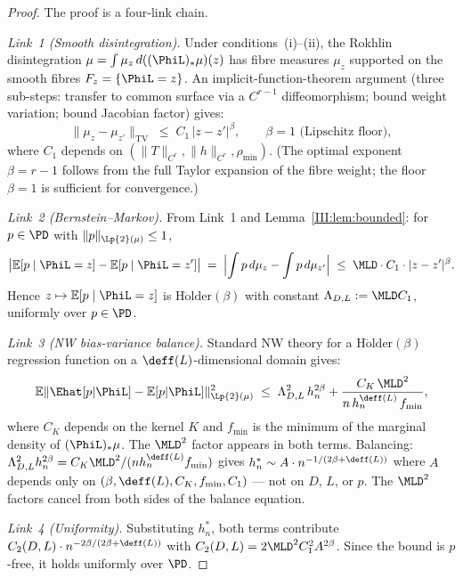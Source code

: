 \ifdraft
\begin{proof}
The proof is a four-link chain.

\emph{Link~1 (Smooth disintegration).}
Under conditions~(i)--(ii), the Rokhlin disintegration
$\mu = \int \mu_z\,d((\PhiL)_*\mu)(z)$ has fibre measures $\mu_z$ supported on
the smooth fibres $F_z = \{\PhiL = z\}$.
An implicit-function-theorem argument (three sub-steps: transfer to common
surface via a $C^{r-1}$ diffeomorphism; bound weight variation; bound
Jacobian factor) gives:
\[
  \|\mu_z - \mu_{z'}\|_{\mathrm{TV}} \;\leq\; C_1\,|z - z'|^\beta,
  \qquad \beta = 1 \text{ (Lipschitz floor)},
\]
where $C_1$ depends on $(\|T\|_{C^r}, \|h\|_{C^r}, \rho_{\min})$.
(The optimal exponent $\beta = r-1$ follows from the full Taylor expansion of
the fibre weight; the floor $\beta = 1$ is sufficient for convergence.)

\emph{Link~2 (Bernstein--Markov).}
From Link~1 and Lemma~\ref{III:lem:bounded}: for $p \in \PD$ with
$\|p\|_{\Lp{2}(\mu)} \leq 1$,
\[
  \bigl|\mathbb{E}[p \mid \PhiL = z] - \mathbb{E}[p \mid \PhiL = z']\bigr|
  \;=\; \Bigl|\int p\,d\mu_z - \int p\,d\mu_{z'}\Bigr|
  \;\leq\; \MLD \cdot C_1 \cdot |z - z'|^\beta.
\]
Hence $z \mapsto \mathbb{E}[p \mid \PhiL = z]$ is $\mathrm{H\ddot{o}lder}(\beta)$
with constant $\Lambda_{D,L} := \MLD C_1$, uniformly over $p \in \PD$.

\emph{Link~3 (NW bias-variance balance).}
Standard NW theory \cite{Gyorfi2002} for a $\mathrm{H\ddot{o}lder}(\beta)$
regression function on a $\deff(L)$-dimensional domain gives:
\[
  \mathbb{E}\|\Ehat[p|\PhiL] - \mathbb{E}[p|\PhiL]\|_{\Lp{2}(\mu)}^2
  \;\leq\; \Lambda_{D,L}^2\,h_n^{2\beta}
    + \frac{C_K\,\MLD^2}{n\,h_n^{\deff(L)}\,f_{\min}},
\]
where $C_K$ depends on the kernel $K$ and $f_{\min}$ is the minimum of the
marginal density of $(\PhiL)_*\mu$.
The $\MLD^2$ factor appears in both terms.
Balancing: $\Lambda_{D,L}^2 h_n^{2\beta} = C_K \MLD^2 / (n h_n^{\deff(L)} f_{\min})$
gives $h_n^* \sim A \cdot n^{-1/(2\beta+\deff(L))}$ where $A$ depends only
on $(\beta, \deff(L), C_K, f_{\min}, C_1)$ --- not on $D$, $L$, or $p$.
The $\MLD^2$ factors cancel from both sides of the balance equation.

\emph{Link~4 (Uniformity).}
Substituting $h_n^*$, both terms contribute
$C_2(D,L) \cdot n^{-2\beta/(2\beta+\deff(L))}$ with
$C_2(D,L) = 2\MLD^2 C_1^2 A^{2\beta}$.
Since the bound is $p$-free, it holds uniformly over $\PD$.
\end{proof}
\else
